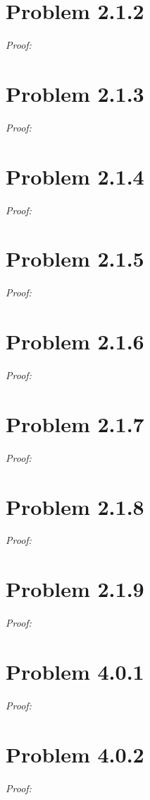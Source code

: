 \documentclass[11pt]{article}
\begin{document}
\section{Problem 2.1.2}
\textit{Proof:} 
\newpage

\section{Problem 2.1.3}
\textit{Proof:} 
\newpage

\section{Problem 2.1.4}
\textit{Proof:} 
\newpage

\section{Problem 2.1.5}
\textit{Proof:} 
\newpage

\section{Problem 2.1.6}
\textit{Proof:} 
\newpage

\section{Problem 2.1.7}
\textit{Proof:} 
\newpage

\section{Problem 2.1.8}
\textit{Proof:} 
\newpage

\section{Problem 2.1.9}
\textit{Proof:} 
\newpage

\section{Problem 4.0.1}
\textit{Proof:} 
\newpage

\section{Problem 4.0.2}
\textit{Proof:} 
\newpage
\end{document}

